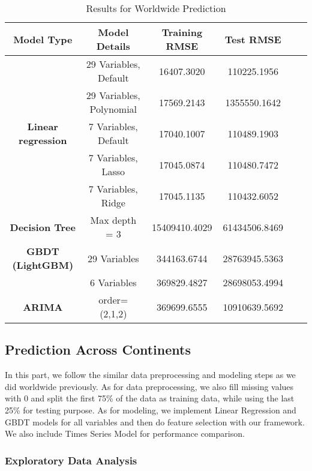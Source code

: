 \documentclass{article}
\begin{document}
\begin{table}[H]
        \centering
        \caption{Results for Worldwide Prediction}\label{tab:results}
        \begin{tabular}{c c c c c c}
            \toprule
            Model Type & Model Details & Training RMSE & Test RMSE\\
            \hline
            & 29 Variables, Default & 16407.3020 & 110225.1956 \\
            & 29 Variables, Polynomial & 17569.2143 & 1355550.1642 \\
            
            \textbf{Linear regression}& 7 Variables, Default & 17040.1007 & 110489.1903 \\
            & 7 Variables, Lasso & 17045.0874 & 110480.7472 \\
            & 7 Variables, Ridge & 17045.1135 & 110432.6052 \\
            \hline
            \textbf{Decision Tree}& Max depth = 3 & 15409410.4029 & 61434506.8469  \\
            \hline
            \textbf{GBDT (LightGBM)}& 29 Variables & 344163.6744 & 28763945.5363 \\
            & 6 Variables & 369829.4827 & 28698053.4994 \\
            \hline
            \textbf{ARIMA}& order=(2,1,2)  & 369699.6555 & 10910639.5692 \\
            \bottomrule
        \end{tabular}
\end{table}


\subsection{Prediction Across Continents}

In this part, we follow the similar data preprocessing and modeling steps as we did worldwide previously. As for data preprocessing, we also fill missing values with 0 and split the first 75\% of the data as training data, while using the last 25\% for testing purpose. As for modeling, we implement Linear Regression and GBDT models for all variables and then do feature selection with our framework. We also include Times Series Model for performance comparison. 

\subsubsection{Exploratory Data Analysis}
\end{document}
